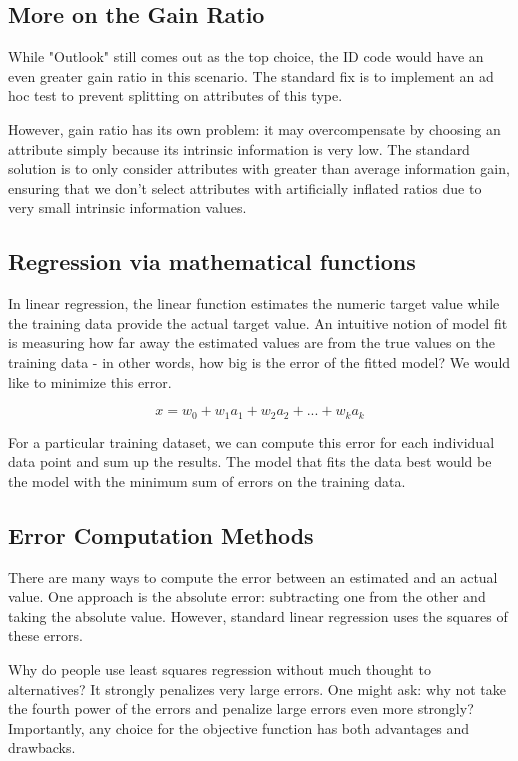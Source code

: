 \subsection{More on the Gain Ratio}

    While "Outlook" still comes out as the top choice, the ID code would have an even greater gain ratio in this scenario. The standard fix is to implement an ad hoc test to prevent splitting on attributes of this type.
    
    However, gain ratio has its own problem: it may overcompensate by choosing an attribute simply because its intrinsic information is very low. The standard solution is to only consider attributes with greater than average information gain, ensuring that we don't select attributes with artificially inflated ratios due to very small intrinsic information values.


\subsection{Regression via mathematical functions}

    In linear regression, the linear function estimates the numeric target value while the training data provide the actual target value. An intuitive notion of model fit is measuring how far away the estimated values are from the true values on the training data - in other words, how big is the error of the fitted model? We would like to minimize this error.
    
    \begin{equation}
    x = w_0 + w_1 a_1 + w_2 a_2 + ... + w_k a_k
    \end{equation}
    
    For a particular training dataset, we can compute this error for each individual data point and sum up the results. The model that fits the data best would be the model with the minimum sum of errors on the training data.


\subsection{Error Computation Methods}

    There are many ways to compute the error between an estimated and an actual value. One approach is the absolute error: subtracting one from the other and taking the absolute value. However, standard linear regression uses the squares of these errors.
    
    Why do people use least squares regression without much thought to alternatives? It strongly penalizes very large errors. One might ask: why not take the fourth power of the errors and penalize large errors even more strongly? Importantly, any choice for the objective function has both advantages and drawbacks.
    
